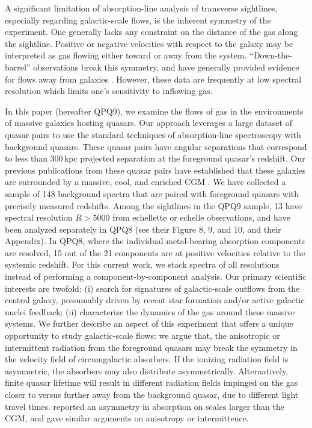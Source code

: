 \documentclass[iop]{emulateapj}
\begin{document}
A significant limitation of absorption-line analysis of transverse sightlines, especially
regarding galactic-scale flows, is the inherent symmetry of the experiment. One generally lacks
any constraint on the distance of the gas along the sightline. Positive or negative velocities
with respect to the galaxy may be interpreted as gas flowing either toward or away from the
system. ``Down-the-barrel'' observations break this symmetry, and have generally provided evidence
for flows away from galaxies \citep{Rupke+05,Martin05,Weiner+09,Rubin+14}. However, these data are
frequently at low spectral resolution which limits one's sensitivity to inflowing gas.

In this paper (hereafter QPQ9), we examine the flows of gas in the environments of massive
galaxies hosting quasars. Our approach leverages a large dataset of quasar pairs
\citep[][hereafter QPQ1]{QPQ1} to use the standard techniques of absorption-line spectroscopy
with background quasars. These quasar pairs
have angular separations that correspond to less than 300\,kpc projected separation at the
foreground quasar's redshift. Our previous publications from these quasar pairs have established
that these galaxies are surrounded by a massive, cool, and enriched CGM
\citep[QPQ5, QPQ6, QPQ7:][]{QPQ5,QPQ6,QPQ7}. We have collected a sample of 148 background
spectra that are paired with foreground quasars with precisely measured redshifts. Among the
sightlines in the QPQ9 sample, 13 have spectral resolution $R>5000$ from echellette or echelle
observations, and have been analyzed separately in QPQ8 (see their Figure 8, 9, and 10, and their
Appendix). In QPQ8, where the individual metal-bearing absorption components are resolved, 15 out
of the 21 components are at positive velocities relative to the systemic redshift. For this
current work, we stack spectra of all resolutions instead of performing a component-by-component
analysis. Our primary scientific interests are twofold: (i) search for signatures of galactic-scale
outflows from the central galaxy, presumably driven by recent star formation and/or active galactic
nuclei feedback; (ii) characterize the dynamics of the gas around these massive systems. We further
describe an aspect of this experiment that offers a unique opportunity to study galactic-scale
flows: we argue that, the anisotropic or intermittent radiation from the foreground quasars may
break the symmetry in the velocity field of circumgalactic absorbers. If the ionizing radiation
field is asymmetric, the absorbers may also distribute asymmetrically. Alternatively, finite quasar
lifetime will result in different radiation fields impinged on the gas closer to versus further
away from the background quasar, due to different light travel times. \cite{KirkmanTytler08}
reported an asymmetry in  absorption on scales larger than the CGM, and gave similar
arguments on anisotropy or intermittence.
\end{document}
